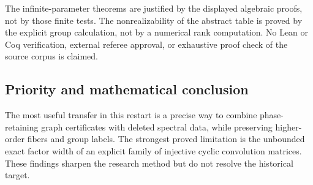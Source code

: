 \documentclass[11pt,a4paper,oneside]{report}
\theoremstyle{definition}
\theoremstyle{remark}
\begin{document}
The infinite-parameter theorems are justified by the displayed algebraic proofs, not by those finite tests. The nonrealizability of the abstract table is proved by the explicit group calculation, not by a numerical rank computation. No Lean or Coq verification, external referee approval, or exhaustive proof check of the source corpus is claimed.
\subsection{Priority and mathematical conclusion}
The most useful transfer in this restart is a precise way to combine phase-retaining graph certificates with deleted spectral data, while preserving higher-order fibers and group labels. The strongest proved limitation is the unbounded exact factor width of an explicit family of injective cyclic convolution matrices. These findings sharpen the research method but do not resolve the historical target.

\noindent{}
\end{document}
